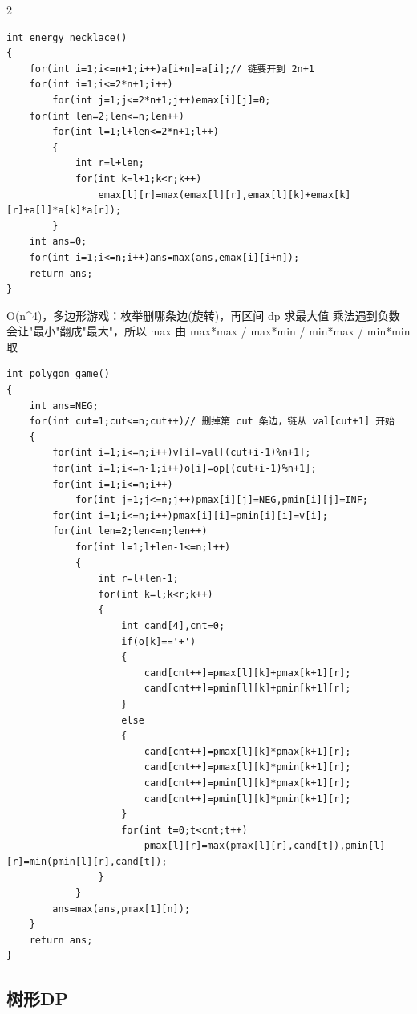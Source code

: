 \documentclass[UTF8,fontset=fandol,a4paper,twoside]{ctexart}
\newcommand{\note}[1]{{\fontsize{10}{12}\selectfont #1\par}}
\begin{document}
\begin{multicols}{2}
\begin{lstlisting}
int energy_necklace()
{
    for(int i=1;i<=n+1;i++)a[i+n]=a[i];// 链要开到 2n+1
    for(int i=1;i<=2*n+1;i++)
        for(int j=1;j<=2*n+1;j++)emax[i][j]=0;
    for(int len=2;len<=n;len++)
        for(int l=1;l+len<=2*n+1;l++)
        {
            int r=l+len;
            for(int k=l+1;k<r;k++)
                emax[l][r]=max(emax[l][r],emax[l][k]+emax[k][r]+a[l]*a[k]*a[r]);
        }
    int ans=0;
    for(int i=1;i<=n;i++)ans=max(ans,emax[i][i+n]);
    return ans;
}
\end{lstlisting}
\note{O(\allowbreak{}n\textasciicircum{}4)\allowbreak{}，多边形游戏：枚举删哪条边(\allowbreak{}旋转)\allowbreak{}，再区间 dp 求最大值 乘法遇到负数会让"最小"翻成"最大"，所以 max 由 max*max /\allowbreak{} max*min /\allowbreak{} min*max /\allowbreak{} min*min 取}
\begin{lstlisting}
int polygon_game()
{
    int ans=NEG;
    for(int cut=1;cut<=n;cut++)// 删掉第 cut 条边，链从 val[cut+1] 开始
    {
        for(int i=1;i<=n;i++)v[i]=val[(cut+i-1)%n+1];
        for(int i=1;i<=n-1;i++)o[i]=op[(cut+i-1)%n+1];
        for(int i=1;i<=n;i++)
            for(int j=1;j<=n;j++)pmax[i][j]=NEG,pmin[i][j]=INF;
        for(int i=1;i<=n;i++)pmax[i][i]=pmin[i][i]=v[i];
        for(int len=2;len<=n;len++)
            for(int l=1;l+len-1<=n;l++)
            {
                int r=l+len-1;
                for(int k=l;k<r;k++)
                {
                    int cand[4],cnt=0;
                    if(o[k]=='+')
                    {
                        cand[cnt++]=pmax[l][k]+pmax[k+1][r];
                        cand[cnt++]=pmin[l][k]+pmin[k+1][r];
                    }
                    else
                    {
                        cand[cnt++]=pmax[l][k]*pmax[k+1][r];
                        cand[cnt++]=pmax[l][k]*pmin[k+1][r];
                        cand[cnt++]=pmin[l][k]*pmax[k+1][r];
                        cand[cnt++]=pmin[l][k]*pmin[k+1][r];
                    }
                    for(int t=0;t<cnt;t++)
                        pmax[l][r]=max(pmax[l][r],cand[t]),pmin[l][r]=min(pmin[l][r],cand[t]);
                }
            }
        ans=max(ans,pmax[1][n]);
    }
    return ans;
}
\end{lstlisting}
\subsection{树形DP}


\end{multicols}
\end{document}
